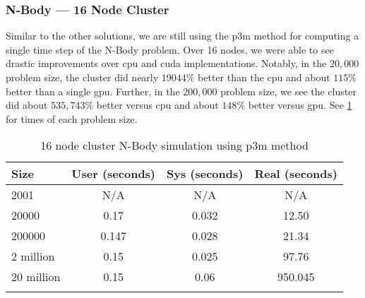 \subsubsection{N-Body --- 16 Node Cluster}

Similar to the other solutions, we are still using the \gls{p3m} method for
computing a single time step of the N-Body problem. Over 16 nodes, we were able
to see drastic improvements over \gls{cpu} and \gls{cuda} implementations.
Notably, in the $20,000$ problem size, the \gls{cluster} did nearly $19044\%$
better than the \gls{cpu} and about $115\%$ better than a single \gls{gpu}.
Further, in the $200,000$ problem size, we see the \gls{cluster} did about
$535,743\%$ better versus \gls{cpu} and about $148\%$ better versus \gls{gpu}.
See \cref{tab:cudampi_nbody} for times of each problem size.

\begin{table}[htb]
\centering{}
\begin{tabular}{lccc}
\toprule{}
\textbf{Size} & \textbf{User (seconds)} &
\textbf{Sys (seconds)} & \textbf{Real (seconds)} \\
\midrule{}
2001          & N/A     & N/A      & N/A     \\
\midrule{}
20000         & 0.17    & 0.032    & 12.50   \\
\midrule{}
200000        & 0.147   & 0.028    & 21.34   \\
\midrule{}
2 million     & 0.15    & 0.025    & 97.76   \\
\midrule{}
20 million    & 0.15    & 0.06     & 950.045 \\
\bottomrule{}
\end{tabular}
\caption{16 node \gls{cluster} N-Body simulation using \gls{p3m} method}
\label{tab:cudampi_nbody}
\end{table}
